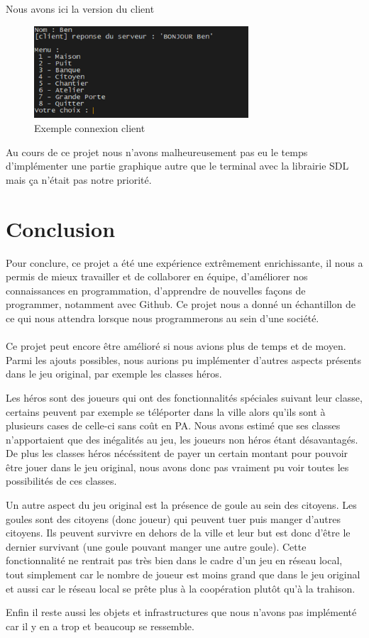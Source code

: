 \documentclass[a4paper,11pt]{article}
\begin{document}
Nous avons ici la version du client
\\
\begin{figure}[h]
    \begin{center}
    \includegraphics[width=8cm] {res2.png}
    \caption{Exemple connexion client}
    \label{client}
    \end{center}
\end{figure}

Au cours de ce projet nous n’avons malheureusement pas eu le temps d’implémenter une partie graphique autre que le terminal avec la librairie SDL mais ça n’était pas notre priorité.


\newpage

\section {Conclusion}
Pour conclure, ce projet a été une expérience extrêmement enrichissante, il nous a permis de mieux travailler et de collaborer en équipe, d'améliorer nos connaissances en programmation, d'apprendre de nouvelles façons de programmer, notamment avec Github. Ce projet nous a donné un échantillon de ce qui nous attendra lorsque nous programmerons au sein d'une société.
\\
\\
Ce projet peut encore être amélioré si nous avions plus de temps et de moyen. Parmi les ajouts possibles, nous aurions pu implémenter d'autres aspects présents dans le jeu original, par exemple les classes héros.

Les héros sont des joueurs qui ont des fonctionnalités spéciales suivant leur classe, certains peuvent par exemple se téléporter dans la ville alors qu'ils sont à plusieurs cases de celle-ci sans coût en PA. Nous avons estimé que ses classes n'apportaient que des inégalités au jeu, les joueurs non héros étant désavantagés. De plus les classes héros nécéssitent de payer un certain montant pour pouvoir être jouer dans le jeu original, nous avons donc pas vraiment pu voir toutes les possibilités de ces classes.

Un autre aspect du jeu original est la présence de goule au sein des citoyens. Les goules sont des citoyens (donc joueur) qui peuvent tuer puis manger d'autres citoyens. Ils peuvent survivre en dehors de la ville et leur but est donc d'être le dernier survivant (une goule pouvant manger une autre goule). Cette fonctionnalité ne rentrait pas très bien dans le cadre d'un jeu en réseau local, tout simplement car le nombre de joueur est moins grand que dans le jeu original et aussi car le réseau local se prête plus à la coopération plutôt qu'à la trahison.

Enfin il reste aussi les objets et infrastructures que nous n'avons pas implémenté car il y en a trop et beaucoup se ressemble.

\newpage
\end{document}
